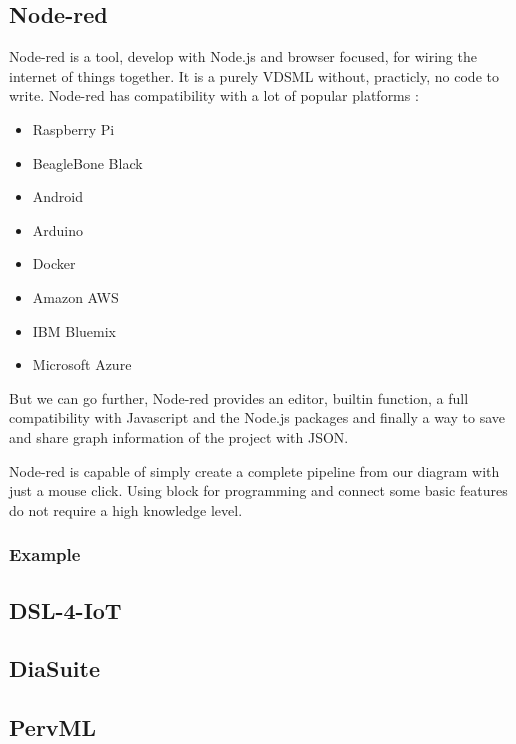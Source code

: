 \subsection{Node-red}
\label{subsec:node-red}

Node-red\cite{node-red} is a tool, develop with Node.js and browser focused, for
wiring the internet of things together. It is a purely VDSML without, practicly,
no code to write. Node-red has compatibility with a lot of popular platforms\cite{node-red} :
\begin{itemize}
\item Raspberry Pi
\item BeagleBone Black
\item Android
\item Arduino
\item Docker
\item Amazon AWS
\item IBM Bluemix
\item Microsoft Azure
\end{itemize}

But we can go further, Node-red provides an editor, builtin function, a full
compatibility with Javascript and the Node.js packages and finally a way to save
and share graph information of the project with JSON.

Node-red is capable of simply create a complete pipeline from our diagram with
just a mouse click. Using block for programming and connect some basic features
do not require a high knowledge level.

\subsubsection{Example}
\label{subsub:node-red-example}

\subsection{DSL-4-IoT}
\label{subsec:dsl-4-iot}

\subsection{DiaSuite}
\label{subsec:diasuite}

\subsection{PervML}
\label{subsec:pervml}

